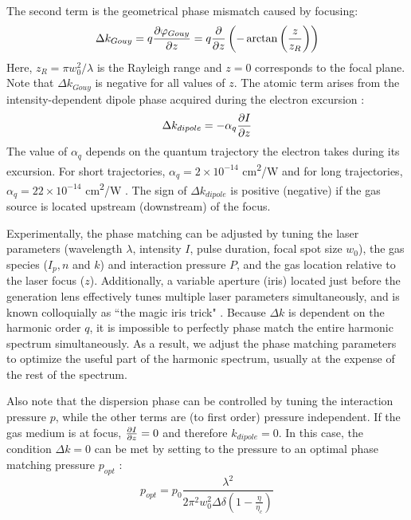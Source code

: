 The second term is the geometrical phase mismatch caused by focusing:
\begin{equation}
\Delta k_{Gouy} = q \pdv{\varphi_{Gouy}}{z} = q \pdv{z} \left( - \arctan \left( \frac{z}{z_R} \right) \right)
\label{eqn:deltak_Gouy}
\end{equation}
Here, $z_R = \pi w_0^2 / \lambda$ is the Rayleigh range and $z=0$ corresponds to the focal plane. Note that $\Delta k_{Gouy}$ is negative for all values of $z$. The atomic term arises from the intensity-dependent dipole phase acquired during the electron excursion \cite{lewensteinTheoryHighharmonicGeneration1994,balcouGeneralizedPhasematchingConditions1997,salieresCoherenceControlHighOrder1995}:
\begin{equation}
\Delta k_{dipole} = - \alpha_q \pdv{I}{z}
\label{eqn:deltak_atomic}
\end{equation}
The value of $\alpha_q$ depends on the quantum trajectory the electron takes during its excursion. For short trajectories, {$\alpha_q = 2 \times 10^{-14}$ cm\textsuperscript{2}/W} and for long trajectories, {$\alpha_q = 22 \times 10^{-14}$ cm\textsuperscript{2}/W} \cite{kazamiasPressureinducedPhaseMatching2011,balcouQuantumpathAnalysisPhase1999}. The sign of $\Delta k_{dipole}$ is positive (negative) if the gas source is located upstream (downstream) of the focus.

Experimentally, the phase matching can be adjusted by tuning the laser parameters (wavelength $\lambda$, intensity $I$, pulse duration, focal spot size $w_0$), the gas species ($I_p, n$ and $k$) and interaction pressure $P$, and the gas location relative to the laser focus ($z$). Additionally, a variable aperture (iris) located just before the generation lens effectively tunes multiple laser parameters simultaneously, and is known colloquially as ``the magic iris trick" \cite{kazamiasHighOrderHarmonic2002}. Because $\Delta k$ is dependent on the harmonic order $q$, it is impossible to perfectly phase match the entire harmonic spectrum simultaneously. As a result, we adjust the phase matching parameters to optimize the useful part of the harmonic spectrum, usually at the expense of the rest of the spectrum.

Also note that the dispersion phase can be controlled by tuning the interaction pressure $p$, while the other terms are (to first order) pressure independent. If the gas medium is at focus, $\pdv{I}{z} = 0$ and therefore $k_{dipole}=0$. In this case, the condition $\Delta k = 0$ can be met by setting to the pressure to an optimal phase matching pressure $p_{opt}$ \cite{rothhardtAbsorptionlimitedPhasematchedHigh2014}:
\begin{equation}
p_{opt} = p_0 \frac{\lambda^2}{2 \pi^2 w_0^2 \Delta \delta \left( 1 - \frac{\eta}{\eta_c} \right)}
\label{eqn:phase_matching_pressure}
\end{equation}

